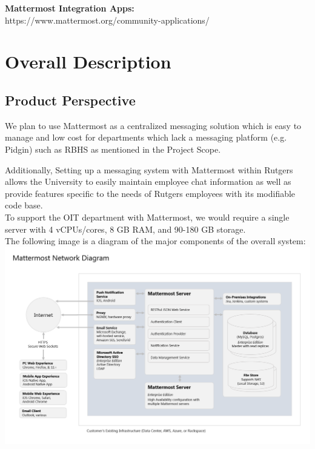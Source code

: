 \documentclass{scrreprt}
\begin{document}
\noindent
\textbf{Mattermost Integration Apps:}\\
https://www.mattermost.org/community-applications/\\


\chapter{Overall Description}

\section{Product Perspective}


We plan to use Mattermost as a centralized messaging solution which is easy to
manage and low cost for departments which lack a messaging platform (e.g.
Pidgin) such as RBHS as mentioned in the Project Scope.

Additionally, Setting up a messaging system with Mattermost within Rutgers allows the
University to easily maintain employee chat information as well as provide
features specific to the needs of Rutgers employees with its modifiable code
base.\\

To support the OIT department with Mattermost, we would require a single server
with 4 vCPUs/cores, 8 GB RAM, and 90-180 GB storage.\\

The following image is a diagram of the major components of the overall system:
\includegraphics[scale=0.5, width=\textwidth]{mattermost-diagram.png}
\end{document}
